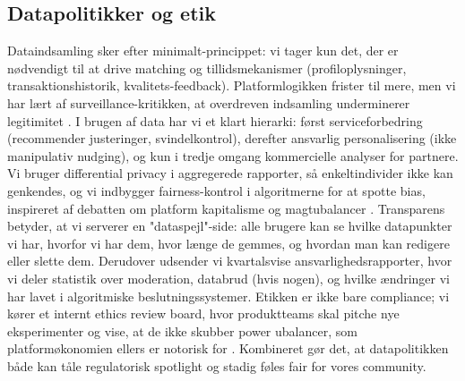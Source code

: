 \subsection*{Datapolitikker og etik}
Dataindsamling sker efter minimalt-princippet: vi tager kun det, der er nødvendigt til at drive matching og tillidsmekanismer (profiloplysninger, transaktionshistorik, kvalitets-feedback). Platformlogikken frister til mere, men vi har lært af surveillance-kritikken, at overdreven indsamling underminerer legitimitet \citet{Zuboff2019}. I brugen af data har vi et klart hierarki: først serviceforbedring (recommender justeringer, svindelkontrol), derefter ansvarlig personalisering (ikke manipulativ nudging), og kun i tredje omgang kommercielle analyser for partnere. Vi bruger differential privacy i aggregerede rapporter, så enkeltindivider ikke kan genkendes, og vi indbygger fairness-kontrol i algoritmerne for at spotte bias, inspireret af debatten om platform kapitalisme og magtubalancer \citet{Srnicek2017}. Transparens betyder, at vi serverer en "dataspejl"-side: alle brugere kan se hvilke datapunkter vi har, hvorfor vi har dem, hvor længe de gemmes, og hvordan man kan redigere eller slette dem. Derudover udsender vi kvartalsvise ansvarlighedsrapporter, hvor vi deler statistik over moderation, databrud (hvis nogen), og hvilke ændringer vi har lavet i algoritmiske beslutningssystemer. Etikken er ikke bare compliance; vi kører et internt ethics review board, hvor produktteams skal pitche nye eksperimenter og vise, at de ikke skubber power ubalancer, som platformøkonomien ellers er notorisk for \citet{Choudary2016}. Kombineret gør det, at datapolitikken både kan tåle regulatorisk spotlight og stadig føles fair for vores community.
